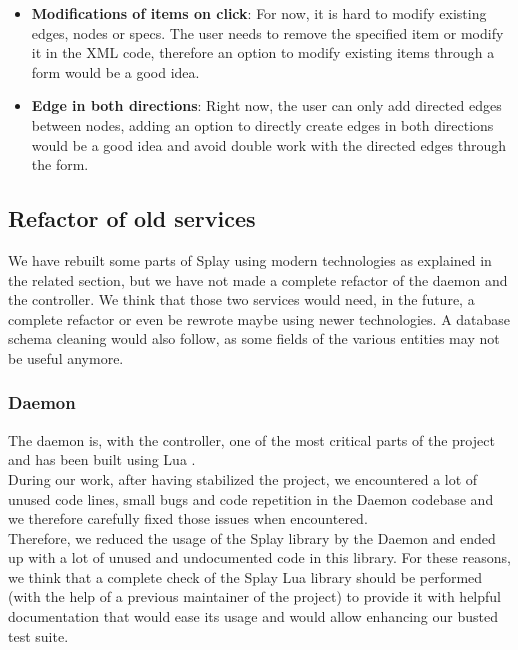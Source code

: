 \documentclass{eplmastersthesis}
\begin{document}
          \begin{itemize}
            \item \textbf{Modifications of items on click}: For now, it is hard
            to modify existing edges, nodes or specs. The user needs to remove
            the specified item or modify it in the XML code, therefore
            an option to modify existing items through a form would be a good
            idea.
            \item \textbf{Edge in both directions}: Right now, the user can only
            add directed edges between nodes, adding an option to directly
            create edges in both directions would be a good idea and
            avoid double work with the directed edges through the form.
          \end{itemize}

      \subsection{Refactor of old services}

        We have rebuilt some parts of Splay using modern technologies as
        explained in the related section, but we have not made a complete
        refactor of the daemon and the controller. We think that those two
        services would need, in the future, a complete refactor or even be
        rewrote maybe using newer technologies. A database schema cleaning
        would also follow, as some fields of the various entities may not be
        useful anymore.

        \subsubsection{Daemon}

          The daemon is, with the controller, one of the most critical parts of
          the project and has been built using Lua \cite{Lua}.\\
          During our work, after having stabilized the project, we encountered
          a lot of unused code lines, small bugs and code repetition in the
          Daemon codebase and we therefore carefully fixed those issues when
          encountered.\\
          Therefore, we reduced the usage of the Splay library by the Daemon
          and ended up with a lot of unused and undocumented code in this
          library. For these reasons, we think that a complete check of the
          Splay Lua library should be performed (with the help of a previous
          maintainer of the project) to provide it with helpful documentation
          that would ease its usage and would allow enhancing our busted test
          suite.\\
\end{document}
